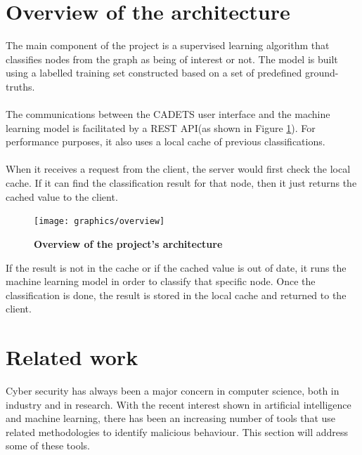 	\section{Overview of the architecture}\label{1.2}
	The main component of the project is a supervised learning algorithm that classifies nodes from the graph as being of interest or not. The model is built using a labelled training set constructed based on a set of predefined ground-truths.
	\\ \\
	The communications between the CADETS user interface and the machine learning model is facilitated by a REST API(as shown in Figure \ref{Figure 1.2}). For performance purposes, it also uses a local cache of previous classifications. 
	\\ \\ 
	When it receives a request from the client, the server would first check the local cache. If it can find the classification result for that node, then it just returns the cached value to the client.
	\begin{figure}[H]
		\centering
		\texttt{[image: graphics/overview]}
		\label{Figure 1.2}
		\caption{\bf Overview of the project's architecture}
	\end{figure}
	
	If the result is not in the cache or if the cached value is out of date, it runs the machine learning model in order to classify that specific node. Once the classification is done, the result is stored in the local cache and returned to the client. 
	
	\section{Related work}
	Cyber security has always been a major concern in computer science, both in industry and in research. With the recent interest shown in artificial intelligence and machine learning, there has been an increasing number of tools that use related methodologies to identify malicious behaviour. This section will address some of these tools. 
	
